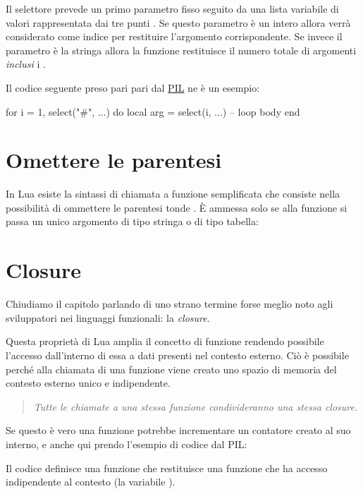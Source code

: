 Il selettore prevede un primo parametro fisso seguito da una lista variabile di
valori rappresentata dai tre punti . Se questo parametro è un intero
allora verrà considerato come indice per restituire l'argomento corrispondente.
Se invece il parametro è la stringa \key{\#} allora la funzione restituisce il
numero totale di argomenti \emph{inclusi} i .

Il codice seguente preso pari pari dal \href{http://www.lua.org/pil/}{PIL} ne è
un esempio:
\begin{lines}
for i = 1, select("#", ...) do
    local arg = select(i, ...)
    -- loop body
end
\end{lines}


\section{Omettere le parentesi}

In Lua esiste la sintassi di chiamata a funzione semplificata che consiste nella
possibilità di ommettere le parentesi tonde \key{()}\luas{()}. È ammessa solo se
alla funzione si passa un unico argomento di tipo stringa o di tipo tabella:


\section{Closure}
\label{secClosure}

Chiudiamo il capitolo parlando di uno strano termine forse meglio noto agli
sviluppatori nei linguaggi funzionali: la \emph{closure}.

Questa proprietà di Lua amplia il concetto di funzione rendendo possibile
l'accesso dall'interno di essa a dati presenti nel contesto esterno. Ciò è
possibile perché alla chiamata di una funzione viene creato uno spazio di
memoria del contesto esterno unico e indipendente.

\begin{quote}
\emph{%
Tutte le chiamate a una stessa funzione condivideranno una stessa closure.%
}
\end{quote}

Se questo è vero una funzione potrebbe incrementare un contatore creato al suo
interno, e anche qui prendo l'esempio di codice dal PIL:

Il codice definisce una funzione  che restituisce una
funzione che ha accesso indipendente al contesto (la variabile ).

